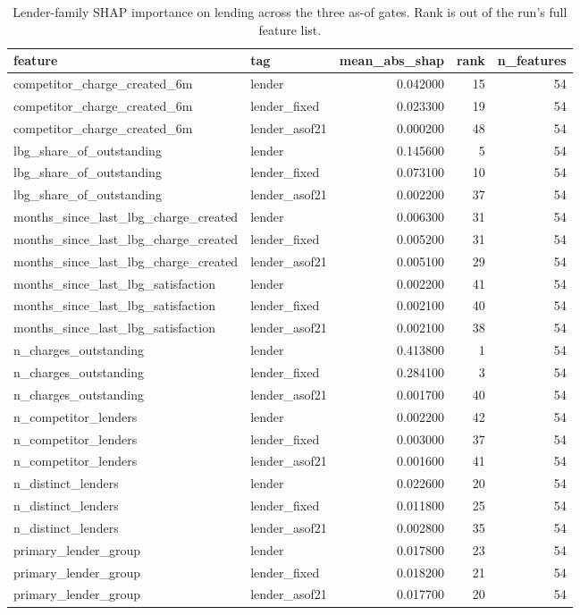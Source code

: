 \begin{table}
\caption{Lender-family SHAP importance on lending across the three as-of gates. Rank is out of the run's full feature list.}
\label{tab:shap_gate_ladder_lending}
\begin{tabular}{llrrr}
\toprule
feature & tag & mean_abs_shap & rank & n_features \\
\midrule
competitor_charge_created_6m & lender & 0.042000 & 15 & 54 \\
competitor_charge_created_6m & lender_fixed & 0.023300 & 19 & 54 \\
competitor_charge_created_6m & lender_asof21 & 0.000200 & 48 & 54 \\
lbg_share_of_outstanding & lender & 0.145600 & 5 & 54 \\
lbg_share_of_outstanding & lender_fixed & 0.073100 & 10 & 54 \\
lbg_share_of_outstanding & lender_asof21 & 0.002200 & 37 & 54 \\
months_since_last_lbg_charge_created & lender & 0.006300 & 31 & 54 \\
months_since_last_lbg_charge_created & lender_fixed & 0.005200 & 31 & 54 \\
months_since_last_lbg_charge_created & lender_asof21 & 0.005100 & 29 & 54 \\
months_since_last_lbg_satisfaction & lender & 0.002200 & 41 & 54 \\
months_since_last_lbg_satisfaction & lender_fixed & 0.002100 & 40 & 54 \\
months_since_last_lbg_satisfaction & lender_asof21 & 0.002100 & 38 & 54 \\
n_charges_outstanding & lender & 0.413800 & 1 & 54 \\
n_charges_outstanding & lender_fixed & 0.284100 & 3 & 54 \\
n_charges_outstanding & lender_asof21 & 0.001700 & 40 & 54 \\
n_competitor_lenders & lender & 0.002200 & 42 & 54 \\
n_competitor_lenders & lender_fixed & 0.003000 & 37 & 54 \\
n_competitor_lenders & lender_asof21 & 0.001600 & 41 & 54 \\
n_distinct_lenders & lender & 0.022600 & 20 & 54 \\
n_distinct_lenders & lender_fixed & 0.011800 & 25 & 54 \\
n_distinct_lenders & lender_asof21 & 0.002800 & 35 & 54 \\
primary_lender_group & lender & 0.017800 & 23 & 54 \\
primary_lender_group & lender_fixed & 0.018200 & 21 & 54 \\
primary_lender_group & lender_asof21 & 0.017700 & 20 & 54 \\
\bottomrule
\end{tabular}
\end{table}
